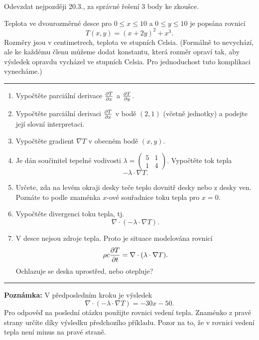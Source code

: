 \documentclass{article}
\begin{document}
{

  Odevzdat nejpozději 20.3., za správné řešení 3 body ke zkoušce.
  
  }


  
  \bigskip
Teplota ve dvourozměrné desce pro $0\leq x\leq 10$ a $0\leq y\leq 10$ je popsána rovnicí
  $$T(x,y)=(x+2y)^2+x^3.$$
  Rozměry jsou v centimetrech, teplota ve stupních Celsia. (Formálně to nevychází, ale ke každému členu můžeme dodat konstantu, která rozměr opraví tak, aby výsledek opravdu vycházel ve stupních Celsia. Pro jednoduchost tuto komplikaci vynecháme.)

  \bigskip
  \hrule
  
\begin{enumerate}[1)]
\item Vypočtěte parciální derivace $\pdv{T}{x}$ a $\pdv{T}{y}$.
\item Vypočtěte parciální derivaci $\pdv{T}{x} (2,1)$ v bodě $(2,1)$ (včetně jednotky) a podejte její slovní interpretaci.
\item Vypočtěte gradient $\nabla T$ v obecném bodě $(x,y)$.
\item Je dán součinitel tepelné vodivosti $\lambda=
  \begin{pmatrix}
    5 & 1\\1&4
  \end{pmatrix}.
$ Vypočtěte tok tepla $$-\lambda \cdot \nabla T.$$
\item Určete, zda na levém okraji desky teče teplo dovnitř desky nebo z desky ven. Poznáte to podle znaménka $x$-ové souřadnice toku tepla pro $x=0$.
\item Vypočtěte divergenci toku tepla, tj. $$\nabla\cdot(-\lambda \cdot \nabla T).$$
\item V desce nejsou zdroje tepla. Proto je situace modelována rovnicí
$$\rho c\pdv{T}{t}=\nabla\cdot(\lambda \cdot \nabla T).$$
  Ochlazuje se deska uprostřed, nebo otepluje?
\end{enumerate}

\hrule
\bigskip

\textbf{Poznámka:} V předposledním kroku je výsledek $$\nabla\cdot(-\lambda \cdot \nabla T)=-30x-50.$$ Pro odpověď na poslední otázku použijte rovnici vedení tepla. Znaménko z pravé strany určíte díky výsledku předchozího příkladu. Pozor na to, že v rovnici vedení tepla není minus na pravé straně.
\end{document}
